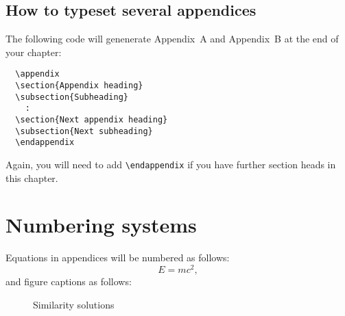 \subsection{How to typeset several appendices}
The following code will genenerate Appendix~A and Appendix~B at the end of your chapter:
\begin{verbatim}
  \appendix
  \section{Appendix heading}
  \subsection{Subheading}
    :
  \section{Next appendix heading}
  \subsection{Next subheading}
  \endappendix
\end{verbatim}
Again, you will need to add \verb"\endappendix" if you have further section heads in this chapter.

\section{Numbering systems}

Equations in appendices will be numbered as follows:
\begin{equation}
  E=mc^2,
\end{equation}
and figure captions as follows:
\begin{figure}[h]
\caption{Similarity solutions}
\end{figure}

\endinput